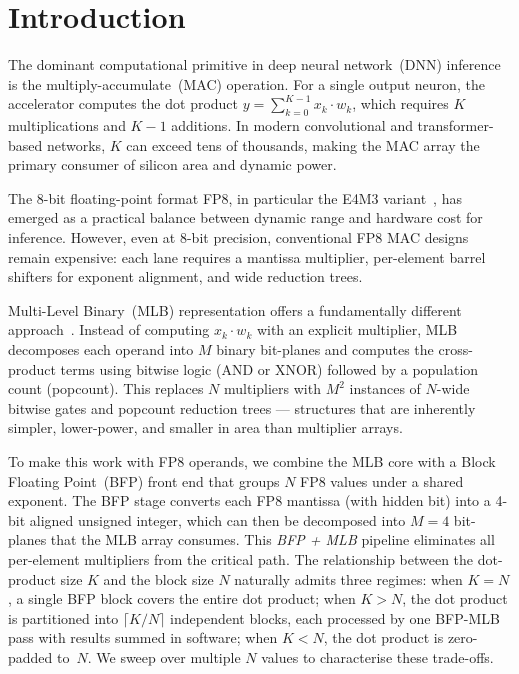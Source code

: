 \documentclass[conference]{IEEEtran}
\begin{document}
\section{Introduction}

The dominant computational primitive in deep neural network~(DNN)
inference is the multiply-accumulate~(MAC) operation.  For a single
output neuron, the accelerator computes the dot product
$y = \sum_{k=0}^{K-1} x_k \cdot w_k$, which requires $K$
multiplications and $K{-}1$ additions.  In modern convolutional and
transformer-based networks, $K$ can exceed tens of thousands, making
the MAC array the primary consumer of silicon area and dynamic power.

The 8-bit floating-point format FP8, in particular the E4M3
variant~\cite{b2,b3}, has emerged as a practical balance between
dynamic range and hardware cost for inference.  However, even at
8-bit precision, conventional FP8 MAC designs remain expensive:
each lane requires a mantissa multiplier, per-element barrel
shifters for exponent alignment, and wide reduction trees.

Multi-Level Binary~(MLB) representation offers a fundamentally
different approach~\cite{b1}.  Instead of computing $x_k \cdot w_k$
with an explicit multiplier, MLB decomposes each operand into $M$
binary bit-planes and computes the cross-product terms using
bitwise logic (AND or XNOR) followed by a population count
(popcount).  This replaces $N$ multipliers with $M^2$ instances of
$N$-wide bitwise gates and popcount reduction trees --- structures
that are inherently simpler, lower-power, and smaller in area
than multiplier arrays.

To make this work with FP8 operands, we combine the MLB core with
a Block Floating Point~(BFP) front end that groups $N$ FP8 values
under a shared exponent.  The BFP stage converts each FP8 mantissa
(with hidden bit) into a 4-bit aligned unsigned integer, which can
then be decomposed into $M = 4$ bit-planes that the MLB array
consumes.  This \emph{BFP + MLB} pipeline eliminates all
per-element multipliers from the critical path.  The relationship
between the dot-product size $K$ and the block size $N$ naturally
admits three regimes: when $K = N$, a single BFP block covers the
entire dot product; when $K > N$, the dot product is partitioned
into $\lceil K/N \rceil$ independent blocks, each processed by one
BFP-MLB pass with results summed in software; when $K < N$,
the dot product is zero-padded to~$N$.  We sweep over multiple
$N$ values to characterise these trade-offs.
\end{document}
